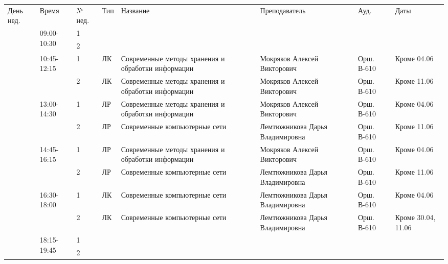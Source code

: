\begin{tabular}{|p{1cm}|p{2.1cm}|p{0.7cm}|p{1cm}|p{9cm}|p{4cm}|p{2.5cm}|p{2.5cm}|}
\hline
День нед. & Время & № нед. & Тип & Название & Преподаватель & Ауд. & Даты \\
\hhline{|=|=|=|=|=|=|=|=|}
\multirow{12}{*}{Пт} & \multirow{2}{*}{09:00-10:30} & 1 &  &  &  &  & \\
\cline{3-8} & & 2 &  &  &  &  & \\
\cline{2-8} & \multirow{2}{*}{10:45-12:15} & 1 & ЛК  & Современные методы хранения и обработки информации & Мокряков Алексей Викторович & Орш. В-610 & Кроме 04.06\\
\cline{3-8} & & 2 & ЛК  & Современные методы хранения и обработки информации & Мокряков Алексей Викторович & Орш. В-610 & Кроме 11.06\\
\cline{2-8} & \multirow{2}{*}{13:00-14:30} & 1 & ЛР  & Современные методы хранения и обработки информации & Мокряков Алексей Викторович & Орш. В-610 & Кроме 04.06\\
\cline{3-8} & & 2 & ЛР  & Современные компьютерные сети & Лемтюжникова Дарья Владимировна & Орш. В-610 & Кроме 11.06\\
\cline{2-8} & \multirow{2}{*}{14:45-16:15} & 1 & ЛР  & Современные методы хранения и обработки информации & Мокряков Алексей Викторович & Орш. В-610 & Кроме 04.06\\
\cline{3-8} & & 2 & ЛР  & Современные компьютерные сети & Лемтюжникова Дарья Владимировна & Орш. В-610 & Кроме 11.06\\
\cline{2-8} & \multirow{2}{*}{16:30-18:00} & 1 & ЛК  & Современные компьютерные сети & Лемтюжникова Дарья Владимировна & Орш. В-610 & Кроме 04.06\\
\cline{3-8} & & 2 & ЛК  & Современные компьютерные сети & Лемтюжникова Дарья Владимировна & Орш. В-610 & Кроме 30.04, 11.06\\
\cline{2-8} & \multirow{2}{*}{18:15-19:45} & 1 &  &  &  &  & \\
\cline{3-8} & & 2 &  &  &  &  & \\
\hline
\end{tabular}
\newpage

